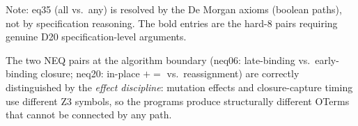 Note: eq35 (all vs.\ any) is resolved by the De Morgan axioms
(boolean paths), not by specification reasoning.  The bold entries
are the hard-8 pairs requiring genuine D20 specification-level
arguments.

The two NEQ pairs at the algorithm boundary (neq06: late-binding vs.\
early-binding closure; neq20: in-place $+$$=$ vs.\ reassignment) are
correctly distinguished by the \emph{effect discipline}: mutation
effects and closure-capture timing use different Z3 symbols, so
the programs produce structurally different OTerms that cannot be
connected by any path.

